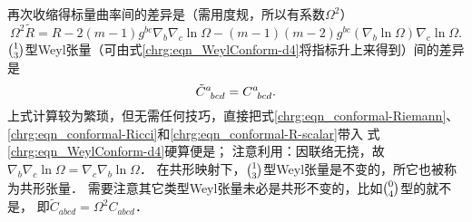 再次收缩得标量曲率间的差异是（需用度规，所以有系数$\Omega^2$）
\begin{equation}\label{chrg:eqn_conformal-R-scalar}
   \Omega^2\tilde{R}= R -2(m-1) g^{bc} {\nabla}_{b}  {\nabla}_c \ln \Omega
        -(m-1)(m-2)  {g}^{bc}({\nabla}_b \ln\Omega){\nabla}_c \ln\Omega .
\end{equation}
$\binom{1}{3}$型Weyl张量（可由式\eqref{chrg:eqn_WeylConform-d4}将指标升上来得到）间的差异是
\begin{equation}\label{chrg:eqn_conformal-Weyl}
    \tilde{C}_{\hphantom{a} bcd}^a = C_{\hphantom{a} bcd}^a .
\end{equation}
上式计算较为繁琐，但无需任何技巧，直接把式\eqref{chrg:eqn_conformal-Riemann}、
\eqref{chrg:eqn_conformal-Ricci}和\eqref{chrg:eqn_conformal-R-scalar}带入
式\eqref{chrg:eqn_WeylConform-d4}硬算便是；
注意利用：因联络无挠，故$\nabla_b \nabla_c \ln \Omega =\nabla_c \nabla_b \ln \Omega$．
在共形映射下，$\binom{1}{3}$型Weyl张量是不变的，所它也被称为{\heiti 共形张量}．
需要注意其它类型Weyl张量未必是共形不变的，比如$\binom{0}{4}$型的就不是，
即$\tilde{C}_{abcd} =\Omega^2 C_{abcd}$．
